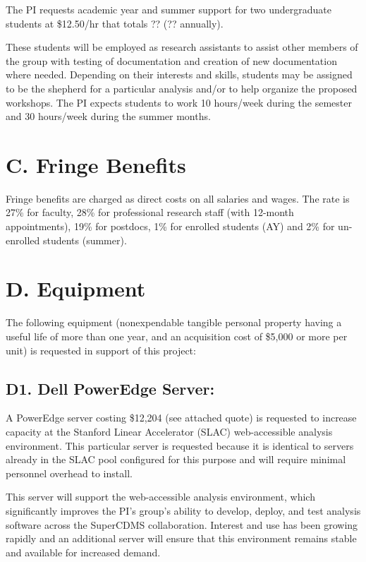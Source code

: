 \documentclass[11pt,oneside]{memoir}
\begin{document}
The PI requests academic year and summer support for two undergraduate students at \$12.50/hr that totals ?? (?? annually).

These students will be employed as research assistants to assist other members of the group with testing of documentation and creation of new documentation where needed.  Depending on their interests and skills, students may be assigned to be the shepherd for a particular analysis and/or to help organize the proposed workshops.  The PI expects students to work 10 hours/week during the semester and 30 hours/week during the summer months.


\section*{C. Fringe Benefits} 

Fringe benefits are charged as direct costs on all salaries and wages. The rate is 27\% for faculty, 28\% for professional research staff (with 12-month appointments), 19\% for postdocs, 1\% for enrolled students (AY) and 2\% for un-enrolled students (summer).

\section*{D. Equipment}
The following equipment (nonexpendable tangible personal property having a useful life of more than one year, and an acquisition cost of \$5,000 or more per unit) is requested in support of this project:

\subsection{D1. Dell PowerEdge Server:}  A PowerEdge server costing \$12,204 (see attached quote) is requested to increase capacity at the Stanford Linear Accelerator (SLAC) web-accessible analysis environment.  This particular server is requested because it is identical to servers already in the SLAC pool configured for this purpose and will require minimal personnel overhead to install.

This server will support the web-accessible analysis environment, which significantly improves the PI's group's ability to develop, deploy, and test analysis software across the SuperCDMS collaboration.  Interest and use has been growing rapidly and an additional server will ensure that this environment remains stable and available for increased demand.
\end{document}
